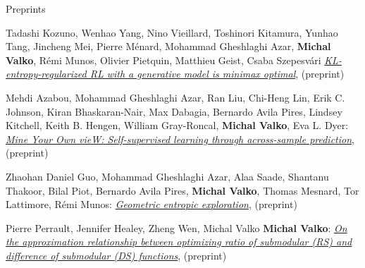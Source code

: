 \documentclass{resume}
\begin{document}
\begin{category}{Preprints}

\citembullet
Tadashi Kozuno, Wenhao Yang, Nino Vieillard, Toshinori Kitamura, Yunhao Tang, Jincheng Mei, Pierre M\' enard, Mohammad Gheshlaghi Azar, {\bf Michal Valko}, R\' emi Munos, Olivier Pietquin, Matthieu Geist, Csaba Szepesv\' ari
\href{https://arxiv.org/pdf/2205.14211.pdf}{\emph{KL-entropy-regularized RL with a generative model is minimax optimal}},
({\sf preprint}) 


\citembullet
Mehdi Azabou, Mohammad Gheshlaghi Azar, Ran Liu, Chi-Heng Lin, Erik C. Johnson, Kiran Bhaskaran-Nair, Max Dabagia, 
Bernardo Avila Pires, Lindsey Kitchell,
Keith B. Hengen, William Gray-Roncal, {\bf Michal Valko}, Eva L. Dyer:
\href{https://arxiv.org/pdf/2102.10106.pdf}{\emph{Mine Your Own vieW: Self-supervised learning through across-sample prediction}},
({\sf preprint}) 


\citembullet
Zhaohan Daniel Guo, Mohammad Gheshlaghi Azar, Alaa Saade, Shantanu Thakoor, Bilal Piot, Bernardo Avila Pires, {\bf Michal Valko}, Thomas Mesnard, Tor Lattimore, R\' emi Munos: 
\href{https://arxiv.org/pdf/2101.02055.pdf}{\emph{Geometric entropic exploration}},
({\sf preprint}) 


\citembullet
Pierre Perrault, Jennifer Healey, Zheng Wen, Michal Valko {\bf Michal Valko}: 
\href{https://arxiv.org/pdf/2101.01631.pdf}{\emph{On the approximation relationship between optimizing ratio of submodular (RS) and difference of submodular (DS) functions}},
 ({\sf preprint}) 
\end{category}
\end{document}
